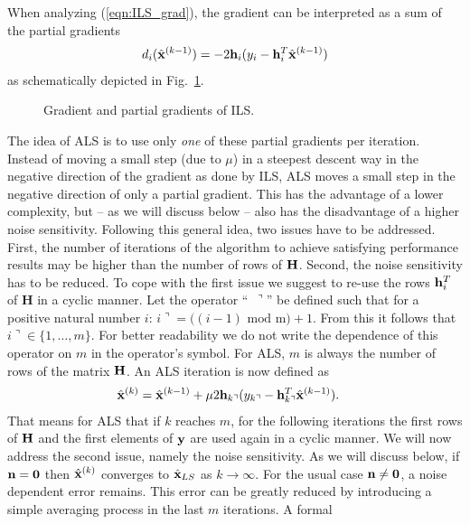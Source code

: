 \documentclass{article}
\begin{document}
When analyzing (\ref{eqn:ILS_grad}), the gradient can be interpreted as a 
sum of the partial gradients 
\begin{align}
{d}_i(\hat{\bf x}^{(k-1)}) = -2{\bf h}_{i}( {y_{i}} - {\bf h}_{i}^T \hat{\bf x}^{(k-1)})
\end{align}
as schematically depicted in Fig.~\ref{fig:partgrad}.
\begin{figure}[h]
\caption{Gradient and partial gradients of ILS.\label{fig:partgrad}}
\end{figure}
The idea of ALS is to use only \emph{one} of these partial gradients per iteration. 
Instead of moving a small step (due to $\mu$) in a steepest descent way in the negative direction of the gradient as done by ILS, 
ALS moves a small step in the negative direction of only a partial
gradient.
This has the advantage
of a lower complexity, but -- as we will discuss below -- also has the disadvantage of a higher noise sensitivity. 
Following this general idea,
two issues have to be addressed. First, the number of iterations 
of the algorithm to achieve satisfying performance results may be higher than the number of rows of $\bf H$. Second, the noise sensitivity has
to be reduced.
To cope with the first issue we suggest to re-use the rows ${\bf h}_i^T$ of {\bf H} in a cyclic manner.
Let the operator ``$\,\,\,\urcorner$'' be defined such that
for a positive natural number $i$: $i\urcorner = ( (i-1)\text{ mod } $m$ ) + 1$. From this it follows 
that $i\urcorner \in \{1,\ldots,m\}$. For better readability we do not
write the dependence of this operator 
on $m$ in the operator's symbol. For ALS, $m$ is always the number of rows of the matrix $\bf H$. 
An ALS iteration is now defined as 
\begin{align}
\hat{\bf x}^{(k)} &= \hat{\bf x}^{(k-1)} + \mu 2 {\bf h}_{k\urcorner} ({y_{k\urcorner}} - {\bf h}_{k\urcorner}^T \hat{\bf x}^{(k-1)}).
\label{eqn:als_main_equation}
\end{align}
That means for ALS that if $k$ reaches $m$, for the following iterations the first rows of $\bf H$ and the first 
elements of $\bf y$ are used again in a cyclic manner. 
We will now address the second issue, namely the noise sensitivity. 
As we will discuss below, if ${\bf n} = {\bf 0}$ then $\hat{\bf x}^{(k)}$ 
converges to $\hat{\bf x}_{LS}$ as $k \rightarrow \infty$. For the usual case
${\bf n} \neq {\bf 0}$, a noise dependent error remains. This
error can be greatly reduced by introducing a simple averaging 
process in the last $m$ iterations. A formal 
\end{document}
